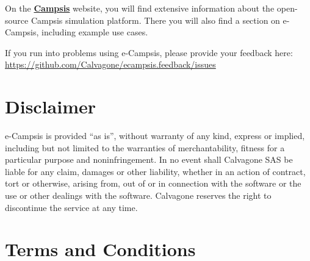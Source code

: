 \documentclass[
]{book}
\begin{document}
On the \href{https://calvagone.github.io/}{\textbf{Campsis}} website, you will find extensive information about the open-source Campsis simulation platform. There you will also find a section on e-Campsis, including example use cases.

If you run into problems using e-Campsis, please provide your feedback here: \url{https://github.com/Calvagone/ecampsis.feedback/issues}

\chapter{Disclaimer}\label{disclaimer}

e-Campsis is provided ``as is'', without warranty of any kind, express or implied, including but not limited to the warranties of merchantability, fitness for a particular purpose and noninfringement. In no event shall Calvagone SAS be liable for any claim, damages or other liability, whether in an action of contract, tort or otherwise, arising from, out of or in connection with the software or the use or other dealings with the software. Calvagone reserves the right to discontinue the service at any time.

\chapter{Terms and Conditions}\label{terms-and-conditions}
\end{document}
